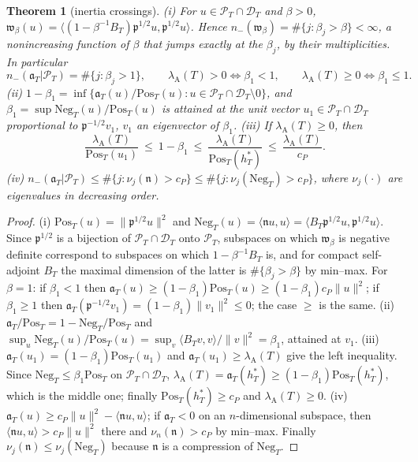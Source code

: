 \documentclass[11pt]{amsart}
\newtheorem{theorem}{Theorem}[section]
\theoremstyle{definition}
\theoremstyle{remark}
\newcommand{\PT}{\mathcal P_T}
\newcommand{\lamA}{\lambda_{\mathrm A}(T)}
\begin{document}
\begin{theorem}[inertia crossings]\label{thm:wh-pencil}
\emph{(i)} For $u\in\PT\cap\mathcal D_T$ and $\beta>0$,
$\mathfrak w_\beta(u)=\langle(1-\beta^{-1}B_T)\mathfrak p^{1/2}u,\mathfrak p^{1/2}u\rangle$. Hence
$n_-(\mathfrak w_\beta)=\#\{j:\beta_j>\beta\}<\infty$, a nonincreasing function of $\beta$ that jumps exactly at the
$\beta_j$, by their multiplicities. In particular
\[
n_-(\mathfrak a_T|\PT)=\#\{j:\beta_j>1\},\qquad \lamA>0\iff\beta_1<1,\qquad \lamA\ge0\iff\beta_1\le1 .
\]
\emph{(ii)} $1-\beta_1=\inf\{\mathfrak a_T(u)/\mathrm{Pos}_T(u):u\in\PT\cap\mathcal D_T\setminus0\}$, and
$\beta_1=\sup\mathrm{Neg}_T(u)/\mathrm{Pos}_T(u)$ is attained at the unit vector $u_1\in\PT\cap\mathcal D_T$ proportional
to $\mathfrak p^{-1/2}v_1$, $v_1$ an eigenvector of $\beta_1$.
\emph{(iii)} If $\lamA\ge0$, then
\begin{equation}\label{eq:wh-sandwich}
\frac{\lamA}{\mathrm{Pos}_T(u_1)}\ \le\ 1-\beta_1\ \le\ \frac{\lamA}{\mathrm{Pos}_T(h^*_T)}\ \le\ \frac{\lamA}{c_P}.
\end{equation}
\emph{(iv)} $n_-(\mathfrak a_T|\PT)\le\#\{j:\nu_j(\mathfrak n)>c_P\}\le\#\{j:\nu_j(\mathrm{Neg}_T)>c_P\}$, where $\nu_j(\cdot)$ are
eigenvalues in decreasing order.
\end{theorem}

\begin{proof}
(i) $\mathrm{Pos}_T(u)=\|\mathfrak p^{1/2}u\|^2$ and $\mathrm{Neg}_T(u)=\langle\mathfrak nu,u\rangle=\langle B_T\mathfrak p^{1/2}u,\mathfrak p^{1/2}u\rangle$.
Since $\mathfrak p^{1/2}$ is a bijection of $\PT\cap\mathcal D_T$ onto $\PT$, subspaces on which $\mathfrak w_\beta$ is
negative definite correspond to subspaces on which $1-\beta^{-1}B_T$ is, and for compact self-adjoint $B_T$ the
maximal dimension of the latter is $\#\{\beta_j>\beta\}$ by min--max. For $\beta=1$: if $\beta_1<1$ then
$\mathfrak a_T(u)\ge(1-\beta_1)\mathrm{Pos}_T(u)\ge(1-\beta_1)c_P\|u\|^2$; if $\beta_1\ge1$ then
$\mathfrak a_T(\mathfrak p^{-1/2}v_1)=(1-\beta_1)\|v_1\|^2\le0$; the case $\ge$ is the same.
(ii) $\mathfrak a_T/\mathrm{Pos}_T=1-\mathrm{Neg}_T/\mathrm{Pos}_T$ and $\sup_u\mathrm{Neg}_T(u)/\mathrm{Pos}_T(u)=\sup_v\langle B_Tv,v\rangle/\|v\|^2=\beta_1$,
attained at $v_1$.
(iii) $\mathfrak a_T(u_1)=(1-\beta_1)\mathrm{Pos}_T(u_1)$ and $\mathfrak a_T(u_1)\ge\lamA$ give the left inequality.
Since $\mathrm{Neg}_T\le\beta_1\mathrm{Pos}_T$ on $\PT\cap\mathcal D_T$, $\lamA=\mathfrak a_T(h^*_T)\ge(1-\beta_1)\mathrm{Pos}_T(h^*_T)$,
which is the middle one; finally $\mathrm{Pos}_T(h^*_T)\ge c_P$ and $\lamA\ge0$.
(iv) $\mathfrak a_T(u)\ge c_P\|u\|^2-\langle\mathfrak nu,u\rangle$; if $\mathfrak a_T<0$ on an $n$-dimensional subspace, then
$\langle\mathfrak nu,u\rangle>c_P\|u\|^2$ there and $\nu_n(\mathfrak n)>c_P$ by min--max. Finally
$\nu_j(\mathfrak n)\le\nu_j(\mathrm{Neg}_T)$ because $\mathfrak n$ is a compression of $\mathrm{Neg}_T$.
\end{proof}
\end{document}
